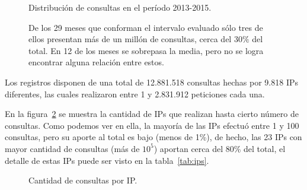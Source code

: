 \begin{figure}[ht]
  \caption{Distribución de consultas en el período 2013-2015.}\label{fig:dates}
  \vspace{-.2cm}
  \caption*{\small
    De los 29 meses que conforman el intervalo evaluado sólo tres de ellos
    presentan más de un millón de consultas, cerca del $30\%$ del total.
    En 12 de los meses se sobrepasa la media, pero no se logra encontrar
    alguna relación entre estos.
  }
\end{figure}

Los registros disponen de una total de 12.881.518 consultas hechas por 9.818 IPs
diferentes, las cuales realizaron entre 1 y 2.831.912 peticiones cada una.

En la figura~\ref{fig:ips} se muestra la cantidad de IPs que realizan hasta
cierto número de consultas.
Como podemos ver en ella, la mayoría de las IPs efectuó entre 1 y 100 consultas,
pero su aporte al total es bajo (menos de 1\%), de hecho, las 23 IPs con mayor
cantidad de consultas (más de $10^5$) aportan cerca del 80\% del total, el
detalle de estas IPs puede ser visto en la tabla~\ref{tab:ips}.

\begin{figure}[ht]
  \caption{Cantidad de consultas por IP.}\label{fig:ips}
\end{figure}

